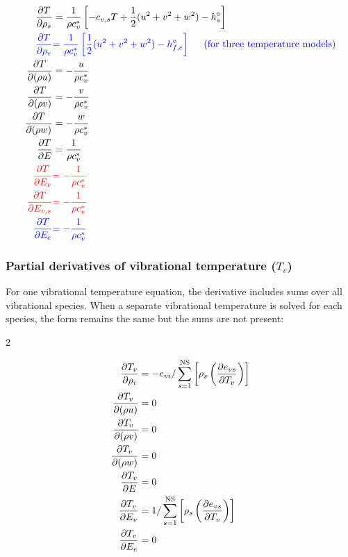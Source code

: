 \documentclass[10pt]{article}
\begin{document}
\begin{flushleft}
\begin{subequations}
    \begin{align}
        \frac{\partial T}{\partial \rho_s} &= \frac{1}{\rho c_v^*} \left[ -c_{v,s}T + \frac{1}{2} (u^2 + v^2 + w^2) - h_s^\circ \right]
        \\ \textcolor{blue}{\frac{\partial T}{\partial \rho_e}} &\textcolor{blue}{= \frac{1}{\rho c_v^*} \left[ \frac{1}{2} (u^2 + v^2 + w^2) - h_{f,e}^\circ \right] \hspace{5mm} \text{(for three temperature models)}}
        \\ \frac{\partial T}{\partial (\rho u)} &= -\frac{u}{\rho c_v^*}
        \\ \frac{\partial T}{\partial (\rho v)} &= -\frac{v}{\rho c_v^*}
        \\ \frac{\partial T}{\partial (\rho w)} &= -\frac{w}{\rho c_v^*}
        \\ \frac{\partial T}{\partial E} &= \frac{1}{\rho c_v^*}
        \\ \textcolor{red}{\frac{\partial T}{\partial E_v}} &\textcolor{red}{= -\frac{1}{\rho c_v^*}}
        \\ \textcolor{red}{\frac{\partial T}{\partial E_{v,s}}} &\textcolor{red}{= -\frac{1}{\rho c_v^*}}
        \\ \textcolor{blue}{\frac{\partial T}{\partial E_e}} &\textcolor{blue}{= -\frac{1}{\rho c_v^*}}
    \end{align}
\end{subequations}

\subsubsection{Partial derivatives of vibrational temperature ($T_v$)}


For one vibrational temperature equation, the derivative includes sums over all vibrational species. When a separate vibrational temperature is solved for each species, the form remains the same but the sums are not present:

\begin{multicols}{2}
    
\begin{subequations}
    \begin{align}
    \frac{\partial T_v}{\partial \rho_i} &= -e_{vi} / \sum_{s=1}^\text{NS} \left[ \rho_s \left( \frac{\partial e_{vs}}{\partial T_v} \right) \right]
    \\ \frac{\partial T_v}{\partial (\rho u)} &= 0
    \\ \frac{\partial T_v}{\partial (\rho v)} &= 0
    \\ \frac{\partial T_v}{\partial (\rho w)} &= 0
    \\ \frac{\partial T_v}{\partial E} &= 0
    \\ \frac{\partial T_v}{\partial E_v} &= 1 / \sum_{s=1}^\text{NS} \left[ \rho_s \left( \frac{\partial e_{vs}}{\partial T_v} \right) \right]
    \\ \frac{\partial T_v}{\partial E_e} &= 0
    \end{align}
\end{subequations}


\end{multicols}
\end{flushleft}
\end{document}
